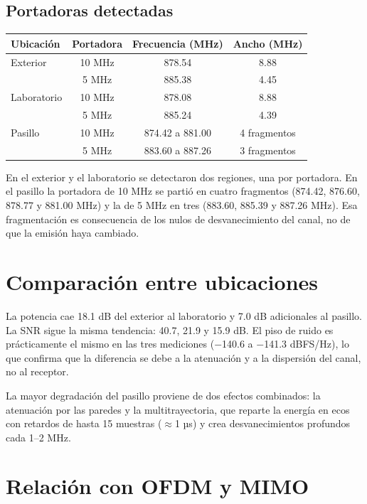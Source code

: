 \documentclass[11pt,a4paper]{article}
\begin{document}
\subsection{Portadoras detectadas}

\begin{tabular}{@{}lccc@{}}
  \toprule
  Ubicación & Portadora & Frecuencia (MHz) & Ancho (MHz) \\
  \midrule
  Exterior & 10 MHz & 878.54 & 8.88 \\
           & 5 MHz  & 885.38 & 4.45 \\
  Laboratorio & 10 MHz & 878.08 & 8.88 \\
              & 5 MHz  & 885.24 & 4.39 \\
  Pasillo & 10 MHz & 874.42 a 881.00 & 4 fragmentos \\
          & 5 MHz  & 883.60 a 887.26 & 3 fragmentos \\
  \bottomrule
\end{tabular}

En el exterior y el laboratorio se detectaron dos regiones, una por portadora. En el pasillo
la portadora de 10 MHz se partió en cuatro fragmentos (874.42, 876.60, 878.77 y
881.00 MHz) y la de 5 MHz en tres (883.60, 885.39 y 887.26 MHz). Esa fragmentación es
consecuencia de los nulos de desvanecimiento del canal, no de que la emisión haya cambiado.

\section{Comparación entre ubicaciones}


La potencia cae 18.1 dB del exterior al laboratorio y 7.0 dB adicionales al pasillo. La SNR
sigue la misma tendencia: 40.7, 21.9 y 15.9 dB. El piso de ruido es prácticamente el mismo
en las tres mediciones ($-$140.6 a $-$141.3 dBFS/Hz), lo que confirma que la diferencia se
debe a la atenuación y a la dispersión del canal, no al receptor.

La mayor degradación del pasillo proviene de dos efectos combinados: la atenuación por las
paredes y la multitrayectoria, que reparte la energía en ecos con retardos de hasta
15 muestras ($\approx$1 µs) y crea desvanecimientos profundos cada 1--2 MHz.

\section{Relación con OFDM y MIMO}
\end{document}
